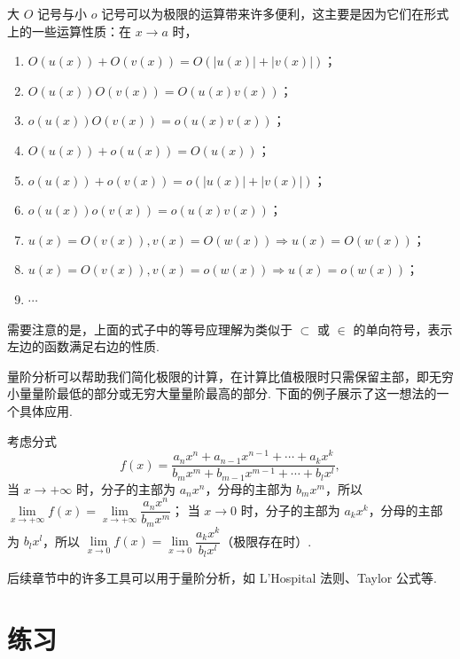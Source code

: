 \documentclass[../main.tex]{subfiles}
\begin{document}
大 $O$ 记号与小 $o$ 记号可以为极限的运算带来许多便利，这主要是因为它们在形式上的一些运算性质：在 $x \to a$ 时，
\begin{enumerate}[label = (\alph*)]
    \item $O(u(x)) + O(v(x)) = O(|u(x)| + |v(x)|)$；
    \item $O(u(x)) O(v(x)) = O(u(x) v(x))$；
    \item $o(u(x)) O(v(x)) = o(u(x) v(x))$；
    \item $O(u(x)) + o(u(x)) = O(u(x))$；
    \item $o(u(x)) + o(v(x)) = o(|u(x)| + |v(x)|)$；
    \item $o(u(x)) o(v(x)) = o(u(x) v(x))$；
    \item $u(x) = O(v(x)), v(x) = O(w(x)) \Rightarrow u(x) = O(w(x))$；
    \item $u(x) = O(v(x)), v(x) = o(w(x)) \Rightarrow u(x) = o(w(x))$；
    \item $\cdots$
\end{enumerate}

需要注意的是，上面的式子中的等号应理解为类似于 $\subset$ 或 $\in$ 的单向符号，表示左边的函数满足右边的性质. 

量阶分析可以帮助我们简化极限的计算，在计算比值极限时只需保留主部，即无穷小量量阶最低的部分或无穷大量量阶最高的部分. 下面的例子展示了这一想法的一个具体应用. 

\begin{example}
    考虑分式 
    $$
    f(x) = \frac{a_n x^n + a_{n - 1} x^{n - 1} + \cdots + a_k x^k}{b_m x^m + b_{m - 1} x^{m - 1} + \cdots + b_l x^l}, 
    $$
    当 $x \to +\infty$ 时，分子的主部为 $a_n x^n$，分母的主部为 $b_m x^m$，所以 $\lim\limits_{x \to +\infty} f(x) = \lim\limits_{x \to +\infty} \dfrac{a_n x^n}{b_m x^m}$；
    当 $x \to 0$ 时，分子的主部为 $a_k x^k$，分母的主部为 $b_l x^l$，所以 $\lim\limits_{x \to 0} f(x) = \lim\limits_{x \to 0} \dfrac{a_k x^k}{b_l x^l}$（极限存在时）. 
\end{example}

后续章节中的许多工具可以用于量阶分析，如 L'Hospital 法则、Taylor 公式等. 


\section*{练习}
\end{document}
